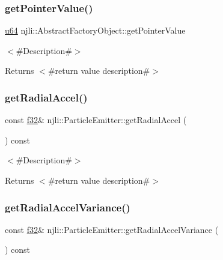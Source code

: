 \subsubsection{\texorpdfstring{get\+Pointer\+Value()}{getPointerValue()}}
{\footnotesize\ttfamily \mbox{\hyperlink{_util_8h_ad758b7a5c3f18ed79d2fcd23d9f16357}{u64}} njli\+::\+Abstract\+Factory\+Object\+::get\+Pointer\+Value}

$<$\#\+Description\#$>$

\begin{DoxyReturn}{Returns}
$<$\#return value description\#$>$ 
\end{DoxyReturn}
\mbox{\label{classnjli_1_1_particle_emitter_a4920e2c1a95891e561f8cc6201ca2231}} 
\subsubsection{\texorpdfstring{get\+Radial\+Accel()}{getRadialAccel()}}
{\footnotesize\ttfamily const \mbox{\hyperlink{_util_8h_a5f6906312a689f27d70e9d086649d3fd}{f32}}\& njli\+::\+Particle\+Emitter\+::get\+Radial\+Accel (\begin{DoxyParamCaption}{ }\end{DoxyParamCaption}) const}

$<$\#\+Description\#$>$

\begin{DoxyReturn}{Returns}
$<$\#return value description\#$>$ 
\end{DoxyReturn}
\mbox{\label{classnjli_1_1_particle_emitter_a6265d5e2fced029bb49323238dbbfd80}} 
\subsubsection{\texorpdfstring{get\+Radial\+Accel\+Variance()}{getRadialAccelVariance()}}
{\footnotesize\ttfamily const \mbox{\hyperlink{_util_8h_a5f6906312a689f27d70e9d086649d3fd}{f32}}\& njli\+::\+Particle\+Emitter\+::get\+Radial\+Accel\+Variance (\begin{DoxyParamCaption}{ }\end{DoxyParamCaption}) const}


